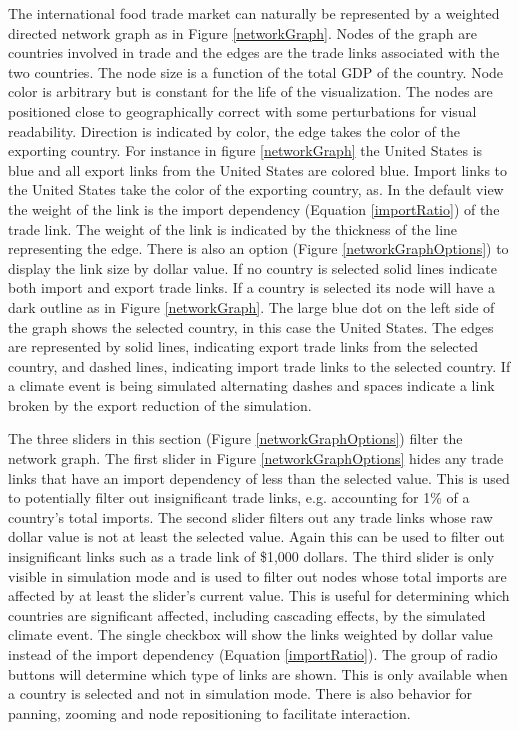 			The international food trade market can naturally be represented by a weighted directed network graph as in Figure \ref{networkGraph}. Nodes of the graph are countries involved in trade and the edges are the trade links associated with the two countries. The node size is a function of the total GDP of the country. Node color is arbitrary but is constant for the life of the visualization. The nodes are positioned close to geographically correct with some perturbations for visual readability. Direction is indicated by color, the edge takes the color of the exporting country. For instance in figure \ref{networkGraph} the United States is blue and all export links from the United States are colored blue. Import links to the United States take the color of the exporting country, as. In the default view the weight of the link is the import dependency (Equation \ref{importRatio}) of the trade link. The weight of the link is indicated by the thickness of the line representing the edge. There is also an option (Figure \ref{networkGraphOptions}) to display the link size by dollar value. If no country is selected solid lines indicate both import and export trade links. If a country is selected its node will have a dark outline as in Figure \ref{networkGraph}. The large blue dot on the left side of the graph shows the selected country, in this case the United States. The edges are represented by solid lines, indicating export trade links from the selected country, and dashed lines, indicating import trade links to the selected country. If a climate event is being simulated alternating dashes and spaces indicate a link broken by the export reduction of the simulation. \par
			The three sliders in this section (Figure \ref{networkGraphOptions}) filter the network graph. The first slider in Figure \ref{networkGraphOptions} hides any trade links that have an import dependency of less than the selected value. This is used to potentially filter out insignificant trade links, e.g. accounting for 1\% of a country's total imports. The second slider filters out any trade links whose raw dollar value is not at least the selected value. Again this can be used to filter out insignificant links such as a trade link of \$1,000 dollars. The third slider is only visible in simulation mode and is used to filter out nodes whose total imports are affected by at least the slider's current value. This is useful for determining which countries are significant affected, including cascading effects, by the simulated climate event. The single checkbox will show the links weighted by dollar value instead of the import dependency (Equation \ref{importRatio}). The group of radio buttons will determine which type of links are shown. This is only available when a country is selected and not in simulation mode. There is also behavior for panning, zooming and node repositioning to facilitate interaction.\par
